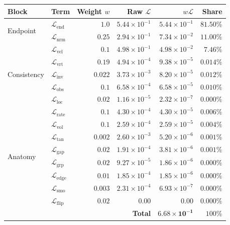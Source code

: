 \documentclass[11pt]{article}
\newcommand{\Loss}{\mathcal{L}}
\begin{document}
\begin{center}
\begin{tabular}{llrrrr}
\toprule
Block & Term & Weight $w$ & Raw $\Loss$ & $w\Loss$ & Share \\
\midrule
\multirow{2}{*}{Endpoint}
 & $\Loss_{\mathrm{end}}$   & $1.0$    & $5.44\!\times\!10^{-1}$ & $5.44\!\times\!10^{-1}$ & $81.50\%$ \\
 & $\Loss_{\mathrm{nrm}}$   & $0.25$   & $2.94\!\times\!10^{-1}$ & $7.34\!\times\!10^{-2}$ & $11.00\%$ \\
\midrule
\multirow{5}{*}{Consistency}
 & $\Loss_{\mathrm{vel}}$   & $0.1$    & $4.98\!\times\!10^{-1}$ & $4.98\!\times\!10^{-2}$ & $7.46\%$ \\
 & $\Loss_{\mathrm{vrt}}$   & $0.19$   & $4.94\!\times\!10^{-4}$ & $9.38\!\times\!10^{-5}$ & $0.014\%$ \\
 & $\Loss_{\mathrm{inv}}$   & $0.022$  & $3.73\!\times\!10^{-3}$ & $8.20\!\times\!10^{-5}$ & $0.012\%$ \\
 & $\Loss_{\mathrm{obs}}$   & $0.1$    & $6.58\!\times\!10^{-4}$ & $6.58\!\times\!10^{-5}$ & $0.010\%$ \\
 & $\Loss_{\mathrm{loc}}$   & $0.02$   & $1.16\!\times\!10^{-5}$ & $2.32\!\times\!10^{-7}$ & $0.000\%$ \\
\midrule
\multirow{8}{*}{Anatomy}
 & $\Loss_{\mathrm{rate}}$  & $0.1$    & $4.30\!\times\!10^{-4}$ & $4.30\!\times\!10^{-5}$ & $0.006\%$ \\
 & $\Loss_{\mathrm{vol}}$   & $0.1$    & $2.59\!\times\!10^{-4}$ & $2.59\!\times\!10^{-5}$ & $0.004\%$ \\
 & $\Loss_{\mathrm{tan}}$   & $0.002$  & $2.60\!\times\!10^{-3}$ & $5.20\!\times\!10^{-6}$ & $0.001\%$ \\
 & $\Loss_{\mathrm{gap}}$   & $0.02$   & $1.91\!\times\!10^{-4}$ & $3.81\!\times\!10^{-6}$ & $0.001\%$ \\
 & $\Loss_{\mathrm{grp}}$   & $0.02$   & $9.27\!\times\!10^{-5}$ & $1.86\!\times\!10^{-6}$ & $0.000\%$ \\
 & $\Loss_{\mathrm{edge}}$  & $0.01$   & $1.85\!\times\!10^{-4}$ & $1.85\!\times\!10^{-6}$ & $0.000\%$ \\
 & $\Loss_{\mathrm{smo}}$   & $0.003$  & $2.31\!\times\!10^{-4}$ & $6.93\!\times\!10^{-7}$ & $0.000\%$ \\
 & $\Loss_{\mathrm{flip}}$  & $0.02$   & $0.00$                  & $0.00$                  & $0.000\%$ \\
\midrule
\multicolumn{4}{r}{\textbf{Total}} & $\bm{6.68\!\times\!10^{-1}}$ & $100\%$ \\
\bottomrule
\end{tabular}
\end{center}
\end{document}
